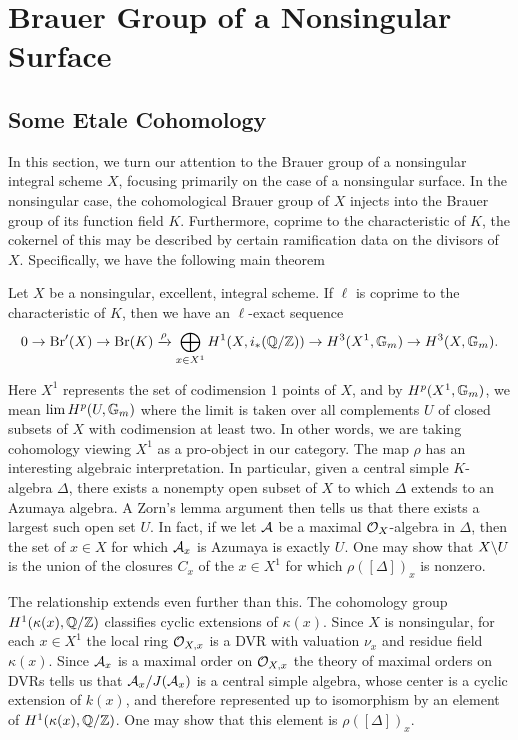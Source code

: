 
\section{Brauer Group of a Nonsingular Surface}
\subsection{Some Etale Cohomology}
In this section, we turn our attention to the Brauer group of a nonsingular integral scheme $X$, focusing primarily on the case of a nonsingular surface.  In the nonsingular case, the cohomological Brauer group of $X$ injects into the Brauer group of its function field $K$.  Furthermore, coprime to the characteristic of $K$, the cokernel of this may be described by certain ramification data on the divisors of $X$.  Specifically, we have the following main theorem
\begin{thm}
Let $X$ be a nonsingular, excellent, integral scheme.  If $\ell$ is coprime to the characteristic of $K$, then we have an $\ell$-exact sequence
$$0\rightarrow \textnormal{Br}'(X)\rightarrow\textnormal{Br}(K)\xrightarrow{\rho} \bigoplus_{x\in X^1} H^1(X,i_*(\mathbb{Q}/\mathbb{Z}))\rightarrow H^3(X^1,\mathbb{G}_m)\rightarrow H^3(X,\mathbb{G}_m).$$
\end{thm}
Here $X^1$ represents the set of codimension $1$ points of $X$, and by $H^p(X^1,\mathbb{G}_m)$, we mean $\lim H^p(U,\mathbb{G}_m)$ where the limit is taken over all complements $U$ of closed subsets of $X$ with codimension at least two.  In other words, we are taking cohomology viewing $X^1$ as a pro-object in our category.  The map $\rho$ has an interesting algebraic interpretation.  In particular, given a central simple $K$-algebra $\Delta$, there exists a nonempty open subset of $X$ to which $\Delta$ extends to an Azumaya algebra.  A Zorn's lemma argument then tells us that there exists a largest such open set $U$.  In fact, if we let $\mathcal{A}$ be a maximal $\mathcal{O}_X$-algebra in $\Delta$, then the set of $x\in X$ for which $\mathcal{A}_x$ is Azumaya is exactly $U$.  One may show that $X\backslash U$ is the union of the closures $C_x$ of the $x\in X^1$ for which $\rho([\Delta])_x$ is nonzero.

The relationship extends even further than this.  The cohomology group $H^1(\kappa(x),\mathbb{Q}/\mathbb{Z})$ classifies cyclic extensions of $\kappa(x)$.  Since $X$ is nonsingular, for each $x\in X^1$ the local ring $\mathcal{O}_{X,x}$ is a DVR with valuation $\nu_x$ and residue field $\kappa(x)$.  Since $\mathcal{A}_x$ is a maximal order on $\mathcal{O}_{X,x}$ the theory of maximal orders on DVRs tells us that $\mathcal{A}_x/J(\mathcal{A}_x)$ is a central simple algebra, whose center is a cyclic extension of $k(x)$, and therefore represented up to isomorphism by an element of $H^1(\kappa(x),\mathbb{Q}/\mathbb{Z})$.  One may show that this element is $\rho([\Delta])_x$.


